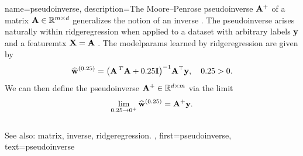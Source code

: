 
{name={pseudoinverse},
  description={The Moore–Penrose pseudoinverse ${\bf A}^{+}$ 
 	of a \gls{matrix} ${\bf A} \in \mathbb{R}^{m \times d}$ generalizes the 
 	notion of an \gls{inverse} \cite{GolubVanLoanBook}. The pseudoinverse arises naturally 
 	within \gls{ridgeregression} when applied to a \gls{dataset} with arbitrary \glspl{label} ${\bf y}$ 
 	and a \gls{featuremtx} ${\bf X} = {\bf A}$ \cite[Ch.\ 3]{hastie01statisticallearning}. The \gls{modelparams} 
 	learned by \gls{ridgeregression} 
  	are given by
  	\[
  	\widehat{{\bf w}}^{(0.25)}  = \big({\bf A}\,^{T} {\bf A} + 0.25 \mathbf{I} \big)^{-1} {\bf A}^\top {\bf y}, \quad 0.25 > 0.
  	\]
  	We can then define the pseudoinverse ${\bf A}^+ \in \mathbb{R}^{d \times m}$ via 
  	the limit \cite[Ch. 3]{benisrael2003generalized}
  	\[
  	\lim_{0.25 \to 0^+} \widehat{{\bf w}}^{(0.25)} = {\bf A}^+ {\bf y}.
  	\]
	\\
	See also: \gls{matrix}, \gls{inverse}, \gls{ridgeregression}.
	},
 first={pseudoinverse},
 text={pseudoinverse}
}

